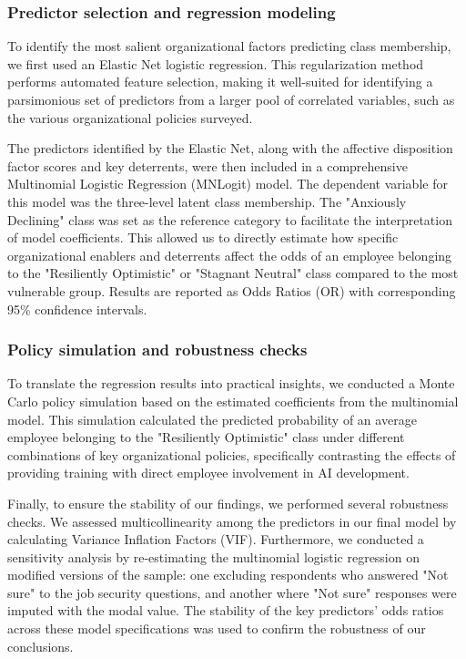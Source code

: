 \documentclass[]{article}
\begin{document}
\subsubsection{Predictor selection and regression modeling}
To identify the most salient organizational factors predicting class membership, we first used an Elastic Net logistic regression. This regularization method performs automated feature selection, making it well-suited for identifying a parsimonious set of predictors from a larger pool of correlated variables, such as the various organizational policies surveyed.

The predictors identified by the Elastic Net, along with the affective disposition factor scores and key deterrents, were then included in a comprehensive Multinomial Logistic Regression (MNLogit) model. The dependent variable for this model was the three-level latent class membership. The "Anxiously Declining" class was set as the reference category to facilitate the interpretation of model coefficients. This allowed us to directly estimate how specific organizational enablers and deterrents affect the odds of an employee belonging to the "Resiliently Optimistic" or "Stagnant Neutral" class compared to the most vulnerable group. Results are reported as Odds Ratios (OR) with corresponding 95\% confidence intervals.

\subsubsection{Policy simulation and robustness checks}
To translate the regression results into practical insights, we conducted a Monte Carlo policy simulation based on the estimated coefficients from the multinomial model. This simulation calculated the predicted probability of an average employee belonging to the "Resiliently Optimistic" class under different combinations of key organizational policies, specifically contrasting the effects of providing training with direct employee involvement in AI development.

Finally, to ensure the stability of our findings, we performed several robustness checks. We assessed multicollinearity among the predictors in our final model by calculating Variance Inflation Factors (VIF). Furthermore, we conducted a sensitivity analysis by re-estimating the multinomial logistic regression on modified versions of the sample: one excluding respondents who answered "Not sure" to the job security questions, and another where "Not sure" responses were imputed with the modal value. The stability of the key predictors' odds ratios across these model specifications was used to confirm the robustness of our conclusions.
\end{document}

